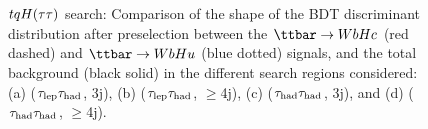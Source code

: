 \begin{figure}[t]
\begin{center}
 \\
 \\
\caption{$tqH(\tau\tau)$ search: Comparison of the shape of the BDT discriminant distribution after preselection between the $\Hc$ (red dashed) and $\Hu$ (blue dotted) signals, 
and the total background (black solid) in the different search regions considered:
(a) ($\tau_{\mathrm{lep}} \tau_{\mathrm{had}}$, 3j), (b) ($\tau_{\mathrm{lep}} \tau_{\mathrm{had}}$, $\geq$4j), (c) ($\tau_{\mathrm{had}} \tau_{\mathrm{had}}$, 3j), and (d) ($\tau_{\mathrm{had}} \tau_{\mathrm{had}}$, $\geq$4j). }
\label{fig:BDT}
\end{center}
\end{figure}
